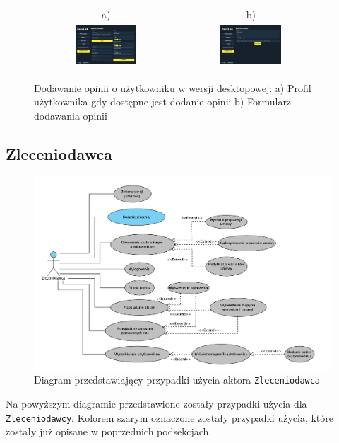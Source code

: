 \begin{figure}[H]
 \centering
  \begin{tabular}{@{}ccc@{}}
  a) & b)\\
  \includegraphics[width=0.45\textwidth]{rozdzial1/profil_opinia_d.jpg} &
  \includegraphics[width=0.45\textwidth]{rozdzial1/dodaj_opinie_d.jpg}
  \end{tabular}
 \caption{Dodawanie opinii o użytkowniku w wersji desktopowej: a) Profil użytkownika gdy dostępne jest dodanie opinii b) Formularz dodawania opinii}
 \label{Dodawanie opini - destkop - ab}
\end{figure}

\subsection{Zleceniodawca}
\begin{figure}[H]
	\centering
		\includegraphics[width=\linewidth]{rozdzial1/PU_zleceniodawca.jpg}
	\caption{Diagram przedstawiający przypadki użycia aktora \texttt{Zleceniodawca}}
	\label{Rys. fig:Diagram przedstawiający przypadki użycia aktora Zleceniodawca}
\end{figure}
Na powyższym diagramie przedstawione zostały przypadki użycia dla \texttt{Zleceniodawcy}. Kolorem szarym oznaczone zostały przypadki użycia, które zostały już opisane w poprzednich podsekcjach.\\

